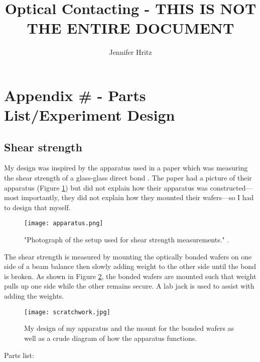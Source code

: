 \documentclass[colorlinks=true,pdfstartview=FitV,linkcolor=blue,
            citecolor=red,urlcolor=magenta]{ligodoc}
\title{Optical Contacting - THIS IS NOT THE ENTIRE DOCUMENT}
\author{Jennifer Hritz}
\begin{document}
\section{Appendix \# - Parts List/Experiment Design}

\subsection{Shear strength}

My design was inspired by the apparatus used in a paper which was measuring the shear strength of a glass-glass direct bond \cite{Helie}. The paper had a picture of their apparatus (Figure \ref{fig:apparatus}) but did not explain how their apparatus was constructed---most importantly, they did not explain how they mounted their wafers---so I had to design that myself.

\begin{figure}[htbp]
\begin{center}
\texttt{[image: apparatus.png]}
\caption{"Photograph of the setup used for shear strength measurements." \cite{Helie}.}
\label{fig:apparatus}
\end{center}
\end{figure}

The shear strength is measured by mounting the optically bonded wafers on one side of a beam balance then slowly adding weight to the other side until the bond is broken. As shown in Figure \ref{fig:myapparatus}, the bonded wafers are mounted such that weight pulls up one side while the other remains secure. A lab jack is used to assist with adding the weights.

\newpage

\begin{figure}[htbp]
\begin{center}
\texttt{[image: scratchwork.jpg]}
\caption{My design of my apparatus and the mount for the bonded wafers as well as a crude diagram of how the apparatus functions.}
\label{fig:myapparatus}
\end{center}
\end{figure}

\newpage

Parts list:
\end{document}
